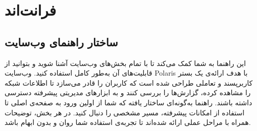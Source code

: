 \chapter{فرانت‌اند}
    \section{ساختار راهنمای وب‌سایت}
    این راهنما به شما کمک می‌کند تا با تمام بخش‌های وب‌سایت آشنا شوید و بتوانید از قابلیت‌های آن به‌طور کامل استفاده کنید. وب‌سایت Polaris با هدف ارائه‌ی یک بستر کاربرپسند و تعاملی طراحی شده است که کاربران را قادر می‌سازد تا اطلاعات شبکه را مشاهده کرده، گزارش‌ها را بررسی کنند و به ابزارهای مدیریتی پیشرفته دسترسی داشته باشند.  
    راهنما به‌گونه‌ای ساختار یافته که شما از اولین ورود به صفحه‌ی اصلی تا استفاده از امکانات پیشرفته، مسیر مشخصی را دنبال کنید. در هر بخش، توضیحات همراه با مراحل عملی ارائه شده‌اند تا تجربه‌ی استفاده شما روان و بدون ابهام باشد.  
